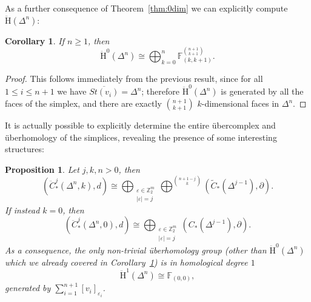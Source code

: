 \documentclass[11pt, a4paper, reqno, twoside, makeidx]{amsart}
\theoremstyle{remark}
\theoremstyle{plain}
\newtheorem{prop}[thm]{Proposition}
\newtheorem{cor}[thm]{Corollary}
\theoremstyle{definition}
\newcommand{\Z}{\mathbb{Z}}
\newcommand{\F}{\mathbb{F}}
\newcommand{\uH}{\ddot{\mathrm{H}}}
\begin{document}
As a further consequence of Theorem~\ref{thm:0dim} we can explicitly compute $\uH(\Delta^n)$:
\begin{cor}\label{cor:uberofsimplices}
If $n \ge 1$, then
$$\uH^0(\Delta^n) \cong \bigoplus_{k =0}^n \F^{\binom{n+1}{k+1}}_{(k,k+1)}.$$
\end{cor}
\begin{proof}
This follows immediately from the previous result, since for all $1\le i\le n+1$ we have $\overline{St(v_i)} = \Delta^n$; therefore $\uH^0(\Delta^n)$ is generated by all the faces of the simplex, and there are exactly $\binom{n+1}{k+1}$ $k$-dimensional faces in $\Delta^n$.
\end{proof}

It is actually possible to explicitly determine the entire \"ubercomplex and  \"uberhomology of the simplices, revealing the presence of some interesting structures: 
\begin{prop}\label{prop:uberofsimplices}
Let $j,k,n>0$, then $$\left( \ddot{C}^j_*(\Delta^n,k), d \right) \cong \bigoplus_{\substack{\varepsilon \in \Z_2^m\\ |\varepsilon| = j}} \bigoplus^{\binom{n+1 - j}{k}} \left( \widetilde{C}_*(\Delta^{j-1}), \partial \right).$$
If instead $k = 0$, then $$\left( \ddot{C}^j_*(\Delta^n,0), d\right) \cong \bigoplus_{\substack{\varepsilon \in \Z_2^m\\ |\varepsilon| = j}} \left( C_*(\Delta^{j-1}), \partial \right).$$
As a consequence, the only non-trivial \"uberhomology group (other than $\uH^0(\Delta^n)$ which we already covered in Corollary~\ref{cor:uberofsimplices}) is in homological degree $1$
$$\uH^1(\Delta^n) \cong \F_{(0,0)},$$
generated by $\sum_{i = 1}^{n+1} [v_i]_{\varepsilon_i}$. 
\end{prop}
\end{document}
